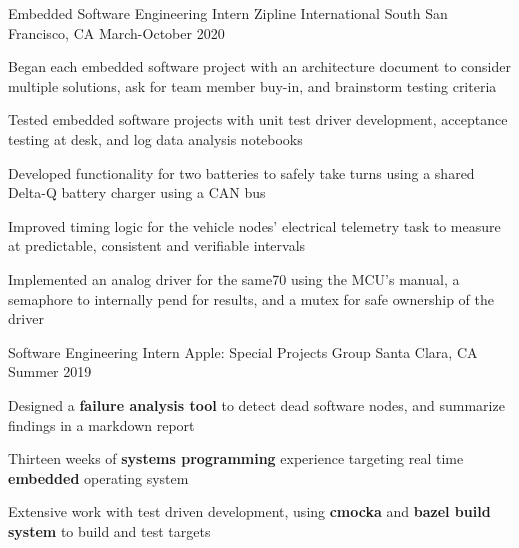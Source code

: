

\begin{cventries}

  
  \cventry
    {Embedded Software Engineering Intern} %
    {Zipline International} %
    {South San Francisco, CA} %
    {March-October 2020} %
    {
      \begin{cvitems} %
        \item {Began each embedded software project with an architecture document to consider multiple solutions, ask for team member buy-in, and brainstorm testing criteria}
        \item {Tested embedded software projects with unit test driver development, acceptance testing at desk, and log data analysis notebooks}
        \item {Developed functionality for two batteries to safely take turns using a shared Delta-Q battery charger using a CAN bus}
        \item {Improved timing logic for the vehicle nodes' electrical telemetry task to measure at predictable, consistent and verifiable intervals}
        \item {Implemented an analog driver for the same70 using the MCU's manual, a semaphore to internally pend for results, and a mutex for safe ownership of the driver}
      \end{cvitems}
    }

  \cventry
    {Software Engineering Intern} %
    {Apple: Special Projects Group} %
    {Santa Clara, CA} %
    {Summer 2019} %
    {
      \begin{cvitems} %
      \item {Designed a \textbf{failure analysis tool} to detect dead software nodes, and summarize findings in a markdown report}
      \item {Thirteen weeks of \textbf{systems programming} experience targeting real time \textbf{embedded} operating system}
      \item {Extensive work with test driven development, using \textbf{cmocka} and \textbf{bazel build system} to build and test targets}
      \end{cvitems}
    }


\end{cventries}

